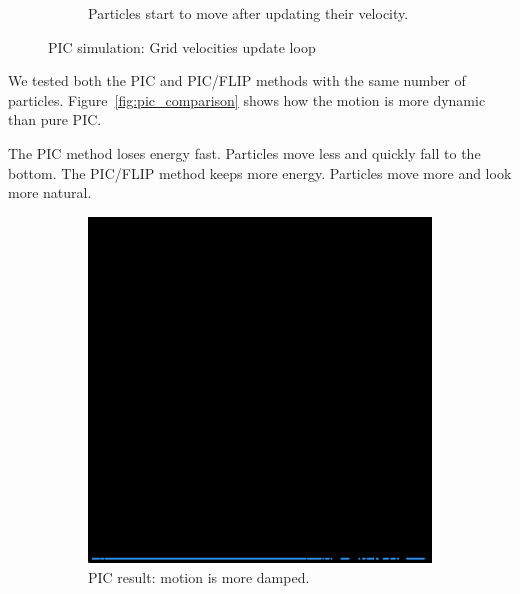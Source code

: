 \begin{figure}[h]
\begin{subfigure}[t]{0.2\textwidth}
    \caption{Particles start to move after updating their velocity.}
  \end{subfigure}
  \caption{PIC simulation: Grid velocities update loop}
  \label{fig:pic}
\end{figure}

We tested both the PIC and PIC/FLIP methods with the same number of particles. Figure~\ref{fig:pic_comparison} shows how the motion is more dynamic than pure PIC.

The PIC method loses energy fast. Particles move less and quickly fall to the bottom.
The PIC/FLIP method keeps more energy. Particles move more and look more natural.

\begin{figure}[h]
    \centering
    \begin{subfigure}[t]{0.2\textwidth}
        \includegraphics[width=\textwidth]{figures/pic_result.png}
        \caption{PIC result: motion is more damped.}
    \end{subfigure}
    \hspace{1em}
    \begin{subfigure}[t]{0.2\textwidth}

\end{subfigure}
\end{figure}
